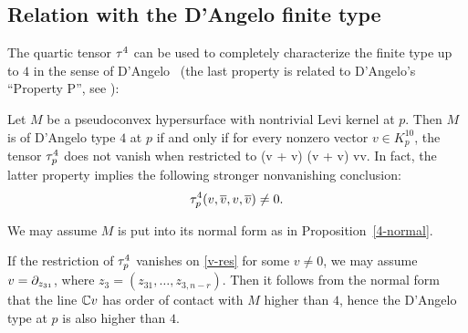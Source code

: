 \documentclass[12pt]{amsart}
\begin{document}
\subsection{Relation with the D'Angelo finite type}
The quartic tensor $\tau^4$ can be used to completely characterize
the finite type up to $4$ in the sense of D'Angelo~\cite{D82}
(the last property is related to D'Angelo's ``Property P'', see \cite[Definition~5.1]{D82}):
%

\bp{}
Let $M$ be a pseudoconvex hypersurface
with nontrivial Levi kernel at $p$.
Then $M$ is of D'Angelo type $4$ at $p$
if and only if for every nonzero vector $v\in K^{10}_p$, the tensor $\tau^4_p$
does not vanish when restricted to 
\beq{}
	(\C v + \C \1v) \times (\C v + \C \1v) \times \C v\times \C \1v.
\eeq
In fact, the latter property implies the following stronger nonvanishing conclusion:
$$
	\tau^4_p(v,\overline{v}, v, \overline{v}) \ne 0.
$$
\ep

\bpf
We may assume $M$ is put into its normal form as in Proposition~\ref{4-normal}.

If the restriction of $\tau^4_p$ vanishes on \eqref{v-res} for some $v\ne 0$,
we may assume $v=\partial_{z_{31}}$, where $z_3=(z_{31},\ldots, z_{3,n-r})$.
Then it follows from the normal form that the line ${\mathbb{C}} v$ has order of contact with $M$
higher than $4$, hence the D'Angelo type at $p$ is also higher than $4$.
\end{document}
